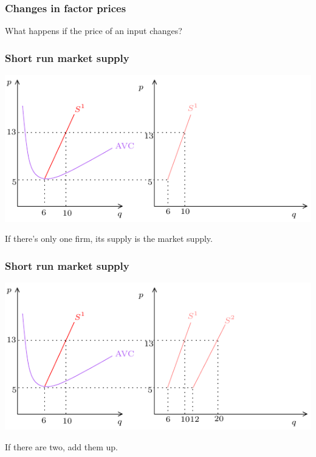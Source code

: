\documentclass[xcolor=pdftex,dvipsnames]{beamer}
\begin{document}
\begin{frame}\frametitle{Changes in factor prices}

What happens if the price of an input changes?
\bigskip

\bigskip

\end{frame} 





\begin{frame}\frametitle{Short run market supply}
\begin{center}
\includegraphics{pics/MarketSupply1}
\end{center}
If there's only one firm, its supply is the market supply.
\end{frame} 

\begin{frame}\frametitle{Short run market supply}
\begin{center}
\includegraphics{pics/MarketSupply2}
\end{center}
If there are two, add them up.
\end{frame} 
\end{document}
